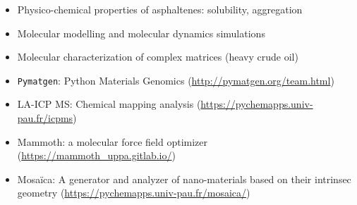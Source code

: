 \documentclass[10pt,a4paper,ragged2e]{altacv}
\begin{document}
\divider

\vspace{-1mm}
\begin{itemize}
\item Physico-chemical properties of asphaltenes: solubility, aggregation
\item Molecular modelling and molecular dynamics simulations
\item Molecular characterization of complex matrices (heavy crude oil)
\end{itemize}

\divider

\vspace{-1mm}
\begin{itemize}
\item \texttt{Pymatgen}: Python Materials Genomics {(\footnotesize\url{http://pymatgen.org/team.html})}
\item LA-ICP MS: Chemical mapping analysis
{(\footnotesize\url{https://pychemapps.univ-pau.fr/icpms})}
\item Mammoth: a molecular force field optimizer \hbox{(\footnotesize\url{https://mammoth_uppa.gitlab.io/})}
\item Mosaïca: A generator and analyzer of nano-materials based on their intrinsec geometry 
\hbox{(\footnotesize\url{https://pychemapps.univ-pau.fr/mosaica/})}
\end{itemize}






\end{document}
